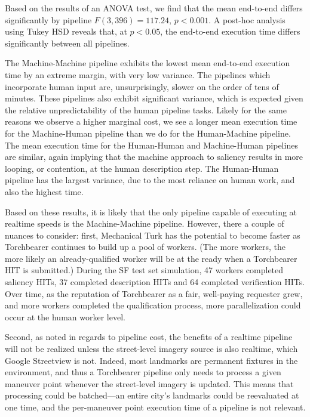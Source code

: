 Based on the results of an ANOVA test, we find that the mean end-to-end differs significantly by pipeline $F(3, 396)=117.24$, $p < 0.001$. A post-hoc analysis using Tukey HSD reveals that, at $p < 0.05$, the end-to-end execution time differs significantly between all pipelines.

The Machine-Machine pipeline exhibits the lowest mean end-to-end execution time by an extreme margin, with very low variance. The pipelines which incorporate human input are, unsurprisingly, slower on the order of tens of minutes. These pipelines also exhibit significant variance, which is expected given the relative unpredictability of the human pipeline tasks. Likely for the same reasons we observe a higher marginal cost, we see a longer mean execution time for the Machine-Human pipeline than we do for the Human-Machine pipeline. The mean execution time for the Human-Human and Machine-Human pipelines are similar, again implying that the machine approach to saliency results in more looping, or contention, at the human description step. The Human-Human pipeline has the largest variance, due to the most reliance on human work, and also the highest time. 

Based on these results, it is likely that the only pipeline capable of executing at realtime speeds is the Machine-Machine pipeline. However, there a couple of nuances to consider: first, Mechanical Turk has the potential to become faster as Torchbearer continues to build up a pool of workers. (The more workers, the more likely an already-qualified worker will be at the ready when a Torchbearer HIT is submitted.) During the SF test set simulation, 47 workers completed saliency HITs, 37 completed description HITs and 64 completed verification HITs. Over time, as the reputation of Torchbearer as a fair, well-paying requester grew, and more workers completed the qualification process, more parallelization could occur at the human worker level.

Second, as noted in regards to pipeline cost, the benefits of a realtime pipeline will not be realized unless the street-level imagery source is also realtime, which Google Streetview is not. Indeed, most landmarks are permanent fixtures in the environment, and thus a Torchbearer pipeline only needs to process a given maneuver point whenever the street-level imagery is updated. This means that processing could be batched---an entire city's landmarks could be reevaluated at one time, and the per-maneuver point execution time of a pipeline is not relevant.

